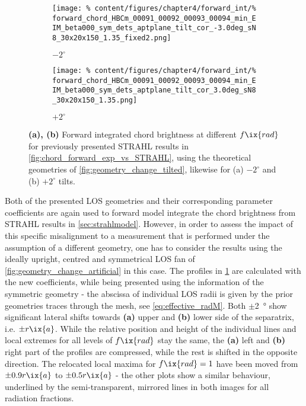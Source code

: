             \begin{figure}[t]%
                \centering%
                \begin{subfigure}{0.47\textwidth}%
                    \texttt{[image: \%
                        content/figures/chapter4/forward\_int/\%
                        forward\_chord\_HBCm\_00091\_00092\_00093\_00094\_min\_EIM\_beta000\_sym\_dets\_aptplane\_tilt\_cor\_-3.0deg\_sN8\_30x20x150\_1.35\_fixed2.png]}%
                    \caption{$-2^{\circ}$}%
                \end{subfigure}%
                \hfill%
                \begin{subfigure}{0.47\textwidth}%
                    \texttt{[image: \%
                        content/figures/chapter4/forward\_int/\%
                        forward\_chord\_HBCm\_00091\_00092\_00093\_00094\_min\_EIM\_beta000\_sym\_dets\_aptplane\_tilt\_cor\_3.0deg\_sN8\_30x20x150\_1.35.png]}%
                    \caption{$+2^{\circ}$}%
                \end{subfigure}%
                \caption{\textbf{(a), (b)} Forward integrated chord brightness at different $f\ix{rad}$ for previously presented STRAHL results in \cref{fig:chord_forward_exp_vs_STRAHL}, using the theoretical geometries of \cref{fig:geometry_change_tilted}, likewise for (a) $-2^{\circ}$ and (b) $+2^{\circ}$ tilts.}\label{fig:chord_change_tilted}%
            \end{figure}%
%
            Both of the presented LOS geometries and their corresponding parameter coefficients are again used to forward model integrate the chord brightness from STRAHL results in \cref{sec:strahlmodel}. However, in order to assess the impact of this specific misalignment to a measurement that is performed under the assumption of a different geometry, one has to consider the results using the ideally upright, centred and symmetrical LOS fan of \cref{fig:geometry_change_artificial} in this case. The profiles in \cref{fig:chord_change_tilted} are calculated with the new coefficients, while being presented using the information of the symmetric geometry - the abscissa of individual LOS radii is given by the prior geometries traces through the mesh, see \cref{eq:effective_radM}. Both $\pm$\SI{2}{\degree} show significant lateral shifts towards \textbf{(a)} upper and \textbf{(b)} lower side of the separatrix, i.e. $\pm r\ix{a}$. While the relative position and height of the individual lines and local extremes for all levels of $f\ix{rad}$ stay the same, the \textbf{(a)} left and \textbf{(b)} right part of the profiles are compressed, while the rest is shifted in the opposite direction. The relocated local maxima for $f\ix{rad}=1$ have been moved from $\pm0.9r\ix{a}$ to $\pm0.5r\ix{a}$ - the other plots show a similar behaviour, underlined by the semi-transparent, mirrored lines in both images for all radiation fractions.\\%
